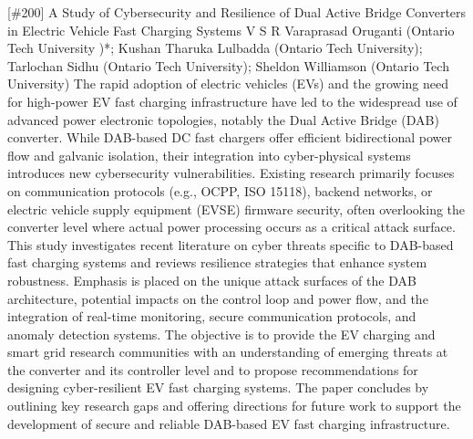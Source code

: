 {} \begin{abstract_online} {[\#200] A Study of Cybersecurity and Resilience of Dual Active Bridge Converters in Electric Vehicle Fast Charging Systems} {} {V S R Varaprasad  Oruganti (Ontario Tech University )*; Kushan Tharuka  Lulbadda (Ontario Tech University); Tarlochan  Sidhu (Ontario Tech University); Sheldon Williamson (Ontario Tech University)} {} The rapid adoption of electric vehicles (EVs) and the growing need for high-power EV fast charging infrastructure have led to the widespread use of advanced power electronic topologies, notably the Dual Active Bridge (DAB) converter. While DAB-based DC fast chargers offer efficient bidirectional power flow and galvanic isolation, their integration into cyber-physical systems introduces new cybersecurity vulnerabilities. Existing research primarily focuses on communication protocols (e.g., OCPP, ISO 15118), backend networks, or electric vehicle supply equipment (EVSE) firmware security, often overlooking the converter level where actual power processing occurs as a critical attack surface. This study investigates recent literature on cyber threats specific to DAB-based fast charging systems and reviews resilience strategies that enhance system robustness. Emphasis is placed on the unique attack surfaces of the DAB architecture, potential impacts on the control loop and power flow, and the integration of real-time monitoring, secure communication protocols, and anomaly detection systems. The objective is to provide the EV charging and smart grid research communities with an understanding of emerging threats at the converter and its controller level and to propose recommendations for designing cyber-resilient EV fast charging systems. The paper concludes by outlining key research gaps and offering directions for future work to support the development of secure and reliable DAB-based EV fast charging infrastructure. \end{abstract_online} 
